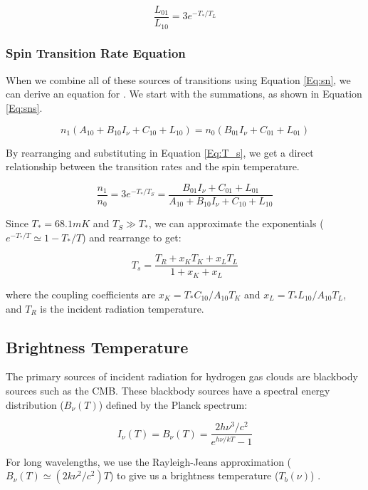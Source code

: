 \begin{equation}
\frac{L_{01}}{L_{10}} = 3 e^{-T_*/T_L}
\end{equation}

\subsubsection{Spin Transition Rate Equation}
When we combine all of these sources of transitions using Equation \ref{Eq:sn}, we can derive an equation for \ts. We start with the summations, as shown in Equation \ref{Eq:sns}.  

\begin{equation}\label{Eq:sns}
n_1(A_{10} + B_{10} I_\nu + C_{10} + L_{10}) = n_0 (B_{01} I_\nu + C_{01} + L_{01})
\end{equation}

By rearranging and substituting in Equation \ref{Eq:T_s}, we get a direct relationship between the transition rates and the spin temperature. 

\begin{equation}
\frac{n_1}{n_0} = 3 e^{-T_*/T_S} = \frac{B_{01} I_\nu + C_{01}+ L_{01}}{A_{10}+ B_{10} I_\nu + C_{10} +L_{10}}
\end{equation}

Since $T_* = 68.1 mK$ and $T_S \gg T_*$, we can approximate the exponentials ($e^{-T_*/T} \simeq 1-T_*/T$) and rearrange to get:

\begin{equation}\label{Eq:dT_s}
T_s = \frac{T_{R} + x_K T_{K} + x_{L} T_{L}}{1+x_K +x_{L}}
\end{equation}

where the coupling coefficients are $x_K = T_* C_{10}/A_{10} T_K$ and $x_L = T_* L_{10} / A_{10} T_L$, and $T_R$ is the incident radiation temperature. 

\subsection{Brightness Temperature}
The primary sources of incident radiation for hydrogen gas clouds are blackbody sources such as the CMB. These blackbody sources have a spectral energy distribution ($B_\nu (T)$) defined by the Planck spectrum:

\begin{equation}
I_{\nu} (T) = B_{\nu}(T) = \frac{ 2 h \nu^3 / c^2}{e^{h \nu / k T}-1}
\end{equation}

For long wavelengths, we use the Rayleigh-Jeans approximation ($B_{\nu} (T) \simeq (2 k \nu^2 / c^2) T$) to give us a brightness temperature ($T_b (\nu)$) \cite{carroll2007}. 

